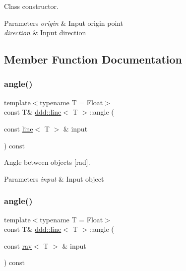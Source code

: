 Class constructor. 


\begin{DoxyParams}{Parameters}
{\em origin} & Input origin point \\
\hline
{\em direction} & Input direction \\
\hline
\end{DoxyParams}


\subsection{Member Function Documentation}
\mbox{\label{classddd_1_1line_a3ce8f1109a657e646d0c334b19c79f53}} 
\subsubsection{\texorpdfstring{angle()}{angle()}\hspace{0.1cm}{\footnotesize\ttfamily [1/4]}}
{\footnotesize\ttfamily template$<$typename T = Float$>$ \\
const T\& \hyperlink{classddd_1_1line}{ddd\+::line}$<$ T $>$\+::angle (\begin{DoxyParamCaption}\item[{const \hyperlink{classddd_1_1line}{line}$<$ T $>$ \&}]{input }\end{DoxyParamCaption}) const\hspace{0.3cm}{\ttfamily [inline]}}



Angle between objects \mbox{[}rad\mbox{]}. 


\begin{DoxyParams}{Parameters}
{\em input} & Input object \\
\hline
\end{DoxyParams}
\mbox{\label{classddd_1_1line_a0d122a300125cbce9b756ed55977c5eb}} 
\subsubsection{\texorpdfstring{angle()}{angle()}\hspace{0.1cm}{\footnotesize\ttfamily [2/4]}}
{\footnotesize\ttfamily template$<$typename T = Float$>$ \\
const T\& \hyperlink{classddd_1_1line}{ddd\+::line}$<$ T $>$\+::angle (\begin{DoxyParamCaption}\item[{const \hyperlink{classddd_1_1ray}{ray}$<$ T $>$ \&}]{input }\end{DoxyParamCaption}) const\hspace{0.3cm}{\ttfamily [inline]}}



